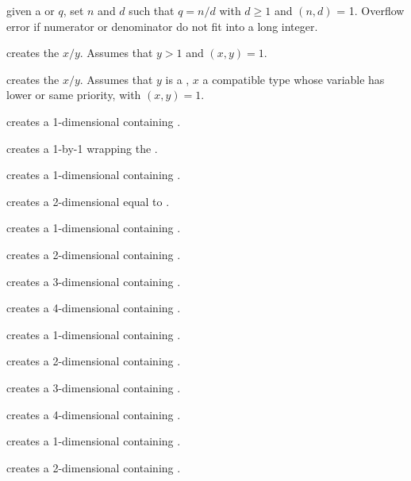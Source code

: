  given a  or  $q$,
set $n$ and $d$ such that $q = n/d$ with $d \geq 1$ and $(n,d)$ = 1. Overflow
error if numerator or denominator do not fit into a long integer.

 creates the  $x/y$. Assumes that
$y > 1$ and $(x,y) = 1$.

 creates the  $x/y$.
Assumes that $y$ is a , $x$ a compatible type whose variable has
lower or same priority, with $(x,y) = 1$.

 creates a 1-dimensional  containing
.

 creates a 1-by-1  wrapping the 
.

 creates a 1-dimensional  containing
.

 creates a 2-dimensional  equal
to \kbd{[x,y]}.

 creates a 1-dimensional 
containing .

 creates a 2-dimensional 
containing .

 creates a 3-dimensional 
containing .

 creates a 4-dimensional
 containing .

 creates a 1-dimensional 
containing .

 creates a 2-dimensional 
containing .

 creates a 3-dimensional 
containing .

 creates a 4-dimensional
 containing .

 creates a 1-dimensional 
containing .

 creates a 2-dimensional 
containing \kbd{[x, y]}.

